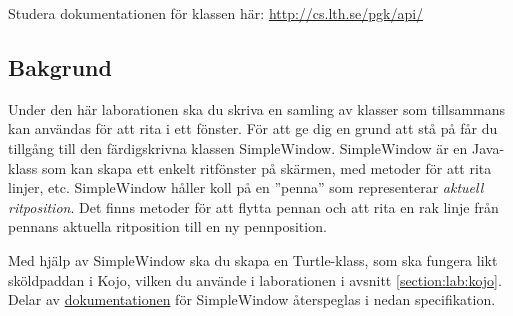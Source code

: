 

\Lab{\LabWeekSIX}

\begin{Goals}

\end{Goals}

\begin{Preparations}
\item {}

\item Studera dokumentationen för klassen  här: \url{http://cs.lth.se/pgk/api/}


\end{Preparations}

\subsection{Bakgrund}

Under den här laborationen ska du skriva en samling av klasser som tillsammans kan användas för att rita i ett fönster. För att ge dig en grund att stå på får du tillgång till den färdigskrivna klassen SimpleWindow. SimpleWindow är en Java-klass som kan skapa ett enkelt ritfönster på skärmen, med metoder för att rita linjer, etc. SimpleWindow håller koll på en ''penna'' som representerar \textit{aktuell ritposition}. Det finns metoder för att flytta pennan och att rita en rak linje från pennans aktuella ritposition till en ny pennposition.

Med hjälp av SimpleWindow ska du skapa en Turtle-klass, som ska fungera likt sköldpaddan i Kojo, vilken du använde i laborationen i avsnitt \ref{section:lab:kojo}. Delar av \href{http://cs.lth.se/pgk/api/}{dokumentationen} för SimpleWindow återspeglas i nedan specifikation.

